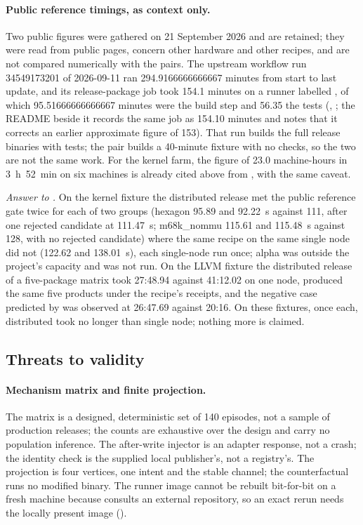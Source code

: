 \paragraph{Public reference timings, as context only.}
Two public figures were gathered on 21 September 2026 and are retained; they
were read from public pages, concern other hardware and other recipes, and are
not compared numerically with the pairs. The upstream
 workflow run 34549173201 of 2026-09-11 ran 294.9166666666667
minutes from start to last update, and its  release-package
job took 154.1 minutes on a runner labelled , of
which 95.51666666666667 minutes were the build step and 56.35 the tests
(,
; the README beside it records the same job as 154.10 minutes
and notes that it corrects an earlier approximate figure of 153). That run
builds the full release binaries with tests; the pair builds a 40-minute
fixture with no checks, so the two are not the same work. For the kernel farm,
the figure of 23.0 machine-hours in 3~h~52~min on six machines is already
cited above from , with the same caveat.

\emph{Answer to .} On the kernel fixture the distributed release met
the public reference gate twice for each of two groups (hexagon 95.89 and
92.22~s against 111, after one rejected candidate at 111.47~s; m68k\_nommu
115.61 and 115.48~s against 128, with no rejected candidate) where the
same recipe on the same single node did not (122.62 and 138.01~s), each
single-node run once; alpha was outside the project's capacity and was not
run. On the LLVM fixture the distributed release of a five-package matrix took
27:48.94 against 41:12.02 on one node, produced the same five products under
the recipe's receipts, and the negative case predicted by  was
observed at 26:47.69 against 20:16. On these fixtures, once each, distributed
took no longer than single node; nothing more is claimed.

\subsection{Threats to validity}
\label{sec:eval:threats}

\paragraph{Mechanism matrix and finite projection.}
The matrix is a designed, deterministic set of 140 episodes, not a sample of
production releases; the counts are exhaustive over the design and carry no
population inference. The after-write injector is an adapter response, not a
crash; the identity check is the supplied local publisher's, not a registry's.
The projection is four vertices, one intent and the stable channel; the
counterfactual runs no modified binary. The runner image cannot be rebuilt
bit-for-bit on a fresh machine because  consults an external
repository, so an exact rerun needs the locally present image
 ().

